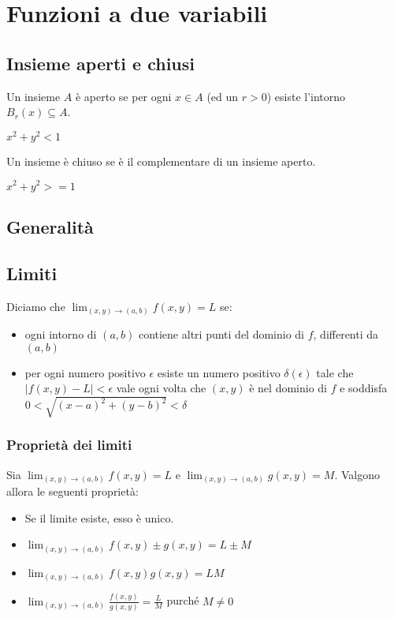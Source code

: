 \chapter{Funzioni a due variabili}

\section{Insieme aperti e chiusi}

\begin{definition}
Un insieme $A$ è aperto se per ogni $x \in A$ (ed un $r>0$) esiste l'intorno $B_r(x) \subseteq A$.
\end{definition}

\begin{example}
$x^2+y^2<1$
\end{example}

\begin{definition}
Un insieme è chiuso se è il complementare di un insieme aperto.
\end{definition}

\begin{example}
$x^2+y^2>=1$
\end{example}

\section{Generalità}

\section{Limiti}

Diciamo che $\lim_{(x,y)\to(a,b)} f(x,y) = L$ se:
\begin{itemize}
\item ogni intorno di $(a,b)$ contiene altri punti del dominio di $f$, differenti da $(a,b)$
\item per ogni numero positivo $\epsilon$ esiste un numero positivo $\delta(\epsilon)$ tale che $|f(x,y)-L|<\epsilon$ vale ogni volta che $(x,y)$ è nel dominio di $f$ e soddisfa $0<\sqrt{(x-a)^2+(y-b)^2}<\delta$
\end{itemize}

\subsection{Proprietà dei limiti}
Sia $\lim_{(x,y)\to(a,b)} f(x,y) = L$ e $\lim_{(x,y)\to(a,b)} g(x,y) = M$. Valgono allora le seguenti proprietà:
\begin{itemize}
\item Se il limite esiste, esso è unico.
\item $\lim_{(x,y)\to(a,b)} f(x,y) \pm g(x,y) = L \pm M$
\item $\lim_{(x,y)\to(a,b)} f(x,y) g(x,y) = LM$
\item $\lim_{(x,y)\to(a,b)} \frac{f(x,y)}{g(x,y)} = \frac{L}{M}$ purché $M \neq 0$
\end{itemize}
